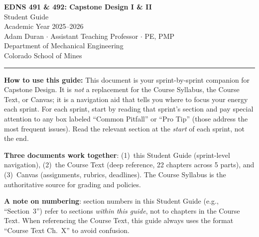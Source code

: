\documentclass[11pt,letterpaper]{article}
\begin{document}
\begin{center}
{\LARGE\bfseries\textcolor{minesblue}{EDNS 491 \& 492: Capstone Design I \& II}}\\[6pt]
{\Large\textcolor{minesblue}{Student Guide}}\\[4pt]
{\large Academic Year 2025--2026}\\[6pt]
{\normalsize Adam Duran $\cdot$ Assistant Teaching Professor $\cdot$ PE, PMP}\\
{\normalsize Department of Mechanical Engineering}\\
{\normalsize Colorado School of Mines}\\[8pt]
\textcolor{minesgold}{\rule{0.7\textwidth}{1.5pt}}
\end{center}

\vspace{12pt}

\textbf{How to use this guide:} This document is your sprint-by-sprint companion for Capstone Design. It is \emph{not} a replacement for the Course Syllabus, the Course Text, or Canvas; it is a navigation aid that tells you where to focus your energy each sprint. For each sprint, start by reading that sprint's section and pay special attention to any box labeled ``Common Pitfall'' or ``Pro Tip'' (those address the most frequent issues). Read the relevant section at the \emph{start} of each sprint, not the end.

\textbf{Three documents work together}: (1)~this Student Guide (sprint-level navigation), (2)~the Course Text (deep reference, 22 chapters across 5 parts), and (3)~Canvas (assignments, rubrics, deadlines). The Course Syllabus is the authoritative source for grading and policies.

\textbf{A note on numbering}: section numbers in this Student Guide (e.g., ``Section~3'') refer to sections \emph{within this guide}, not to chapters in the Course Text. When referencing the Course Text, this guide always uses the format ``Course Text Ch.~X'' to avoid confusion.

\tableofcontents
\newpage





























\end{document}
